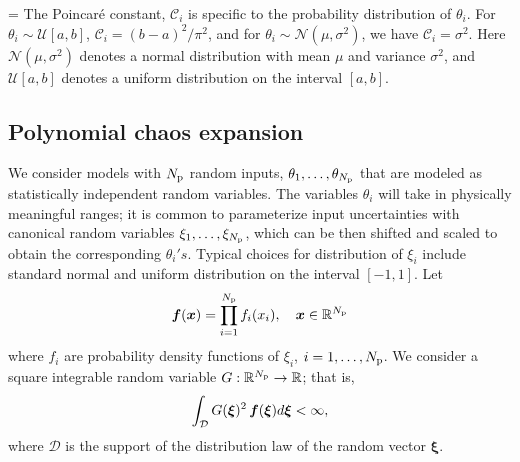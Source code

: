 \be
{} = 
\label{eq:cmu}
\ee
The Poincar\'e constant, $\mathcal{C}_i$ is specific to the probability
distribution of $\theta_i$. For $\theta_i \sim \mathcal{U}[a, b]$,
$\mathcal{C}_i = (b-a)^{2}/\pi^2$, and for  
$\theta_i \sim \mathcal{N}(\mu,\sigma^2)$, we have $\mathcal{C}_i = \sigma^2$. 
Here $\mathcal{N}(\mu,\sigma^2)$ denotes a normal distribution with mean $\mu$
and variance $\sigma^2$, and $\mathcal{U}[a,b]$ denotes a uniform distribution
on the interval $[a, b]$.

%

\subsection{Polynomial chaos expansion}

We consider models with ${N_\text{p}}$ random inputs, 
$\theta_1, \ldots, \theta_{N_\text{p}}$ that are modeled
as statistically independent random variables. The 
variables $\theta_i$ will take in physically meaningful
ranges; it is common to parameterize input uncertainties
with canonical random variables $\xi_1, \ldots, \xi_{N_\text{p}}$,
which can be then shifted and scaled to obtain the corresponding $\theta_i's$.
Typical choices for distribution of $\xi_i$ include standard normal 
and uniform distribution on the interval $[-1, 1]$.
Let 
\[
   \bm{f}(\bm{x}) = \prod_{i=1}^{N_\text{p}} f_i(x_i), \quad \bm{x} \in \mathbb{R}^{N_\text{p}}
\]
where $f_i$ are probability density functions of $\xi_i$, $i = 1, \ldots, {N_\text{p}}$.
We consider a square integrable random variable $G:\mathbb{R}^{N_\text{p}} \to \mathbb{R}$; 
that is,
\[
\int_{\mathcal{D}} G(\bm{\xi})^2 \, \bm{f}(\bm{\xi})d\bm{\xi} < \infty,
\]
where $\mathcal{D}$ is the support of the distribution law of the random vector
$\bm{\xi}$. 



